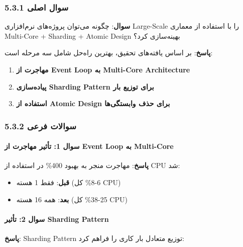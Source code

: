 \documentclass[
]{article}
\providecommand{\tightlist}{%
  \setlength{\itemsep}{0pt}\setlength{\parskip}{0pt}}
\begin{document}
\subsubsection{5.3.1 سوال
اصلی}\label{ux633ux648ux627ux644-ux627ux635ux644ux6cc-1}

\textbf{سوال}: چگونه می‌توان پروژه‌های نرم‌افزاری Large-Scale را با استفاده
از معماری Multi-Core + Sharding + Atomic Design بهینه‌سازی کرد؟

\textbf{پاسخ}: بر اساس یافته‌های تحقیق، بهترین راه‌حل شامل سه مرحله است:

\begin{enumerate}
\def\labelenumi{\arabic{enumi}.}
\tightlist
\item
  \textbf{مهاجرت از Event Loop به Multi-Core Architecture}
\item
  \textbf{پیاده‌سازی Sharding Pattern برای توزیع بار}
\item
  \textbf{استفاده از Atomic Design برای حذف وابستگی‌ها}
\end{enumerate}

\subsubsection{5.3.2 سوالات
فرعی}\label{ux633ux648ux627ux644ux627ux62a-ux641ux631ux639ux6cc-1}

\paragraph{سوال 1: تأثیر مهاجرت از Event Loop به
Multi-Core}\label{ux633ux648ux627ux644-1-ux62aux623ux62bux6ccux631-ux645ux647ux627ux62cux631ux62a-ux627ux632-event-loop-ux628ux647-multi-core}

\textbf{پاسخ}: مهاجرت منجر به بهبود 400\% در استفاده از CPU شد:

\begin{itemize}
\tightlist
\item
  \textbf{قبل}: فقط 1 هسته (6-8\% کل CPU)
\item
  \textbf{بعد}: همه 16 هسته (25-38\% کل CPU)
\end{itemize}

\paragraph{سوال 2: تأثیر Sharding
Pattern}\label{ux633ux648ux627ux644-2-ux62aux623ux62bux6ccux631-sharding-pattern}

\textbf{پاسخ}: Sharding Pattern توزیع متعادل بار کاری را فراهم کرد:
\end{document}
